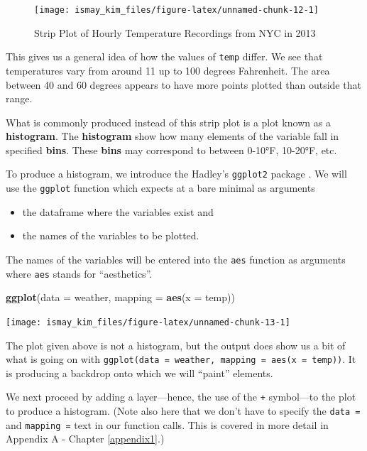 \documentclass[]{tufte-book}
\newenvironment{Shaded}{\begin{snugshade}}{\end{snugshade}}
\newcommand{\KeywordTok}[1]{\textcolor[rgb]{0.13,0.29,0.53}{\textbf{{#1}}}}
\newcommand{\DataTypeTok}[1]{\textcolor[rgb]{0.13,0.29,0.53}{{#1}}}
\newcommand{\NormalTok}[1]{{#1}}
\providecommand{\tightlist}{%
  \setlength{\itemsep}{0pt}\setlength{\parskip}{0pt}}
\begin{document}
\begin{figure}
\texttt{[image: ismay\_kim\_files/figure-latex/unnamed-chunk-12-1]} \caption[Strip Plot of Hourly Temperature Recordings from NYC in 2013]{Strip Plot of Hourly Temperature Recordings from NYC in 2013}\label{fig:unnamed-chunk-12}
\end{figure}

This gives us a general idea of how the values of \texttt{temp} differ.
We see that temperatures vary from around 11 up to 100 degrees
Fahrenheit. The area between 40 and 60 degrees appears to have more
points plotted than outside that range.

What is commonly produced instead of this strip plot is a plot known as
a \textbf{histogram}. The \textbf{histogram} show how many elements of
the variable fall in specified \textbf{bins}. These \textbf{bins} may
correspond to between 0-10°F, 10-20°F, etc.

To produce a histogram, we introduce the Hadley's \texttt{ggplot2}
package \citep{R-ggplot2}. We will use the \texttt{ggplot} function
which expects at a bare minimal as arguments

\begin{itemize}
\tightlist
\item
  the dataframe where the variables exist and
\item
  the names of the variables to be plotted.
\end{itemize}

The names of the variables will be entered into the \texttt{aes}
function as arguments where \texttt{aes} stands for ``aesthetics''.

\begin{Shaded}
\begin{Highlighting}[]
\KeywordTok{ggplot}\NormalTok{(}\DataTypeTok{data =} \NormalTok{weather, }\DataTypeTok{mapping =} \KeywordTok{aes}\NormalTok{(}\DataTypeTok{x =} \NormalTok{temp))}
\end{Highlighting}
\end{Shaded}

\texttt{[image: ismay\_kim\_files/figure-latex/unnamed-chunk-13-1]}

The plot given above is not a histogram, but the output does show us a
bit of what is going on with
\texttt{ggplot(data\ =\ weather,\ mapping\ =\ aes(x\ =\ temp))}. It is
producing a backdrop onto which we will ``paint'' elements.

We next proceed by adding a layer---hence, the use of the \texttt{+}
symbol---to the plot to produce a histogram. (Note also here that we
don't have to specify the \texttt{data\ =} and \texttt{mapping\ =} text
in our function calls. This is covered in more detail in Appendix A -
Chapter \ref{appendix1}.)
\end{document}

